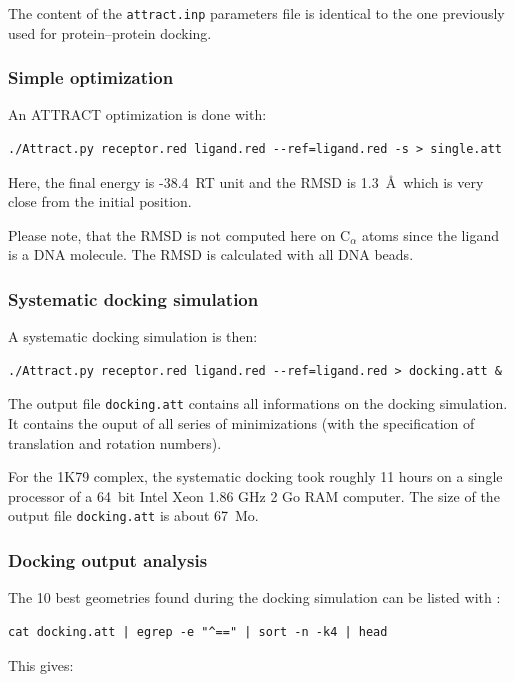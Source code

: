 \documentclass[12pt,a4paper]{article}
\begin{document}
The content of the {\tt attract.inp} parameters file is identical to the one
previously used for protein--protein docking.

\subsubsection{Simple optimization}

An ATTRACT optimization is done with:
\begin{verbatim}
./Attract.py receptor.red ligand.red --ref=ligand.red -s > single.att
\end{verbatim}

Here, the final energy is -38.4~RT unit and the RMSD is 1.3~\AA\ which is very close
from the initial position.

Please note, that the RMSD is not computed here on C$_{\alpha}$ atoms since the
ligand is a DNA molecule. The RMSD is calculated with all DNA beads. 

\subsubsection{Systematic docking simulation}

A systematic docking simulation is then:
\begin{verbatim}
./Attract.py receptor.red ligand.red --ref=ligand.red > docking.att &
\end{verbatim}

The output file {\tt docking.att} contains all informations on the docking 
simulation. It contains the ouput of all series of minimizations 
(with the specification of translation and rotation numbers).

For the 1K79 complex, the systematic docking took roughly 11 hours on a single processor of a 64~bit Intel Xeon 1.86 GHz 2 Go RAM computer.
The size of the output file {\tt docking.att} is about 67~Mo.

\subsubsection{Docking output analysis}

The 10 best geometries found during the docking simulation can be listed with :

\begin{verbatim}
cat docking.att | egrep -e "^==" | sort -n -k4 | head
\end{verbatim}

This gives:
\end{document}
